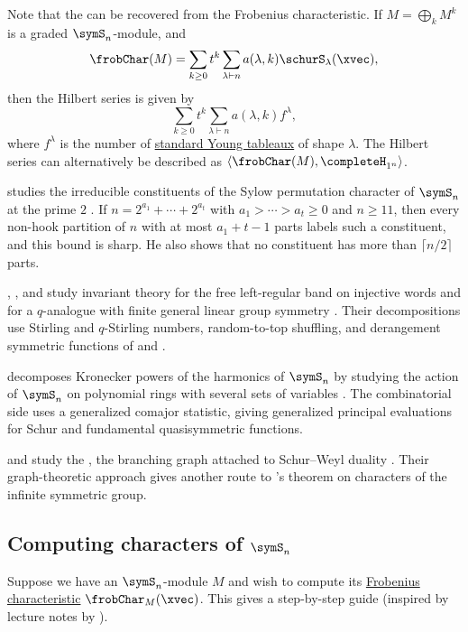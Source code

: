 Note that the \label{hilbertSeries}
can be recovered from the Frobenius characteristic.
If $M = \bigoplus_k M^k$ is a graded $\symS_n$-module, and
\[
\frobChar(M) =
\sum_{k \geq 0} t^k
\sum_{\lambda \vdash n} a(\lambda,k) \schurS_\lambda(\xvec),
\]
then the Hilbert series is given by
\[
\sum_{k \geq 0} t^k \sum_{\lambda \vdash n} a(\lambda,k) f^{\lambda},
\]
where $f^\lambda$ is the number of
\hyperref[prelimTableaux]{standard Young tableaux} of shape $\lambda$.
The Hilbert series can alternatively be described as
$\langle \frobChar(M), \completeH_{1^n} \rangle$.

 studies the irreducible constituents of the Sylow
permutation character of $\symS_n$ at the prime $2$ \cite{Vanzi2026x}.
If $n=2^{a_1}+\dotsb+2^{a_t}$ with $a_1>\dotsb>a_t\geq 0$ and
$n\geq 11$, then every non-hook partition of $n$ with at most
$a_1+t-1$ parts labels such a constituent, and this bound is sharp.  He also
shows that no constituent has more than $\lceil n/2\rceil$ parts.

, , and 
study invariant theory for the free left-regular band on injective words and
for a $q$-analogue with finite general linear group symmetry
\cite{BraunerComminsReiner2023}.  Their decompositions use Stirling and
$q$-Stirling numbers, random-to-top shuffling, and derangement symmetric
functions of  and .

 decomposes Kronecker powers of the harmonics of
$\symS_n$ by studying the action of $\symS_n$ on polynomial rings with several
sets of variables \cite{Romero2022KroneckerPowers}.  The combinatorial side
uses a generalized comajor statistic, giving generalized principal evaluations
for Schur and fundamental quasisymmetric functions.

 and  study the
\label{schurWeylGraph},
the branching graph attached to Schur--Weyl
duality \cite{VershikTsilevich2021}.  Their graph-theoretic approach gives
another route to 's theorem on characters of the infinite
symmetric group.

\subsection[computingSnCharacters]{Computing characters of $\symS_n$}

Suppose we have an $\symS_n$-module $M$ and wish to compute its
\hyperref[frobeniusCharacteristic]{Frobenius characteristic}
$\frobChar_M(\xvec)$.
This gives a step-by-step guide (inspired by lecture notes by ).

